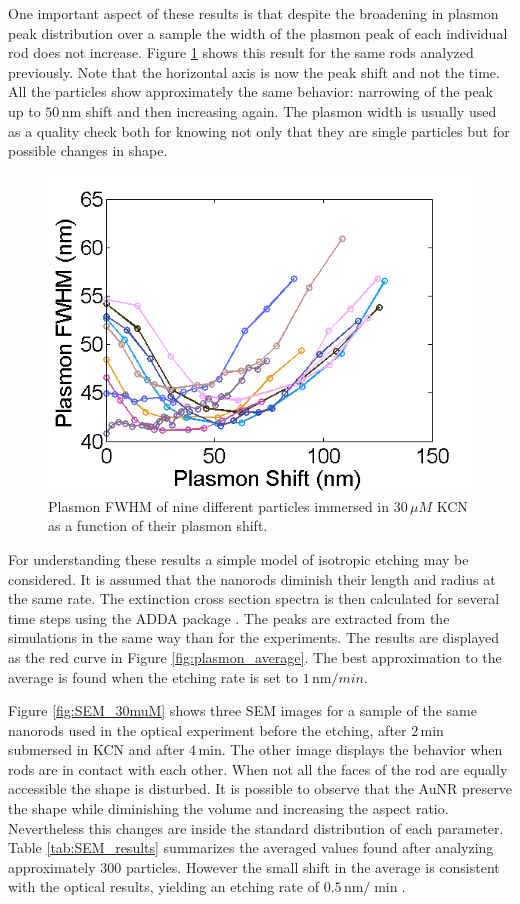 \documentclass[twocolumn]{article}
\begin{document}
One important aspect of these results is that despite the broadening in plasmon
peak distribution over a sample the width of the plasmon peak of each individual
rod does not increase. Figure \ref{fig:FWHM} shows this result for the same rods
analyzed previously. Note that the horizontal axis is now the peak shift and not
the time. All the particles show approximately the same behavior: narrowing of
the peak up to $50\,\textrm{nm}$ shift and then increasing again. The plasmon
width is usually used as a quality check both for knowing not only that they are
single particles but for possible changes in shape.

\begin{figure}[hbt]
 \centering
 \includegraphics[width=0.95\linewidth]{fwhm_several.png}
 \caption{Plasmon FWHM of nine different particles immersed in $30\,\mu M$ KCN
 as a function of their plasmon shift.}
 \label{fig:FWHM}
\end{figure}

For understanding these results a simple model of isotropic etching may be
considered. It is assumed that the nanorods diminish their length and radius at
the same rate. The extinction cross section spectra is then calculated for
several time steps using the ADDA package \cite{Yurkin2011}. The peaks are
extracted from the simulations in the same way than for the experiments. The
results are displayed as the red curve in Figure \ref{fig:plasmon_average}. The
best approximation to the average is found when the etching rate is set to
$1\,\textrm{nm}/min$.

Figure \ref{fig:SEM_30muM} shows three SEM images for a sample of the same
nanorods used in the optical experiment before the etching, after
$2\,\textrm{min}$ submersed in KCN and after $4\,\textrm{min}$. The other image
displays the behavior when rods are in contact with each other. When not all the
faces of the rod are equally accessible the shape is disturbed. It is possible
to observe that the AuNR preserve the shape while diminishing the volume and
increasing the aspect ratio. Nevertheless this changes are inside the standard
distribution of each parameter. Table \ref{tab:SEM_results} summarizes the
averaged values found after analyzing approximately $300$ particles. However the
small shift in the average is consistent with the optical results, yielding an
etching rate of $0.5\,\textrm{nm}/\min$.
\end{document}
